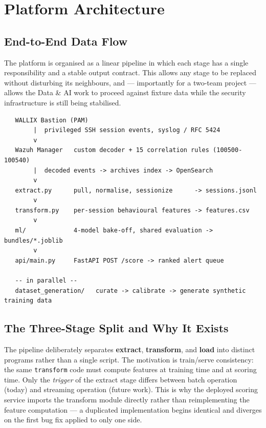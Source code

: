 \documentclass{classeENS}
\begin{document}
\section{Platform Architecture}
\label{sec:architecture}

\subsection{End-to-End Data Flow}
The platform is organised as a linear pipeline in which each stage has a single responsibility and a stable output contract. This allows any stage to be replaced without disturbing its neighbours, and --- importantly for a two-team project --- allows the Data \& AI work to proceed against fixture data while the security infrastructure is still being stabilised.

\begin{verbatim}
   WALLIX Bastion (PAM)
        |  privileged SSH session events, syslog / RFC 5424
        v
   Wazuh Manager   custom decoder + 15 correlation rules (100500-100540)
        |  decoded events -> archives index -> OpenSearch
        v
   extract.py      pull, normalise, sessionize      -> sessions.jsonl
        v
   transform.py    per-session behavioural features -> features.csv
        v
   ml/             4-model bake-off, shared evaluation -> bundles/*.joblib
        v
   api/main.py     FastAPI POST /score -> ranked alert queue

   -- in parallel --
   dataset_generation/   curate -> calibrate -> generate synthetic training data
\end{verbatim}

\subsection{The Three-Stage Split and Why It Exists}
The pipeline deliberately separates \textbf{extract}, \textbf{transform}, and \textbf{load} into distinct programs rather than a single script. The motivation is train/serve consistency: the same \texttt{transform} code must compute features at training time and at scoring time. Only the \emph{trigger} of the extract stage differs between batch operation (today) and streaming operation (future work). This is why the deployed scoring service imports the transform module directly rather than reimplementing the feature computation --- a duplicated implementation begins identical and diverges on the first bug fix applied to only one side.
\end{document}
